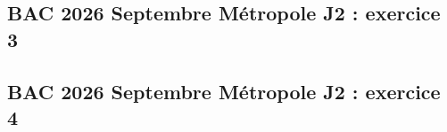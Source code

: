 \documentclass[lang=fr,edition=teacher,layout=sheet]{mxbook}
\begin{document}
\begingroup\endgroup
\par\bigskip
{}\subsection*{BAC 2026 Septembre Métropole J2 : exercice 3}
\begingroup\endgroup
\par\bigskip
{}\subsection*{BAC 2026 Septembre Métropole J2 : exercice 4}
\begingroup\endgroup
\par\bigskip
\end{document}

